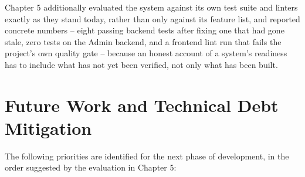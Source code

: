 \documentclass[12pt,a4paper]{report}
\begin{document}
Chapter 5 additionally evaluated the system against its own test suite
and linters exactly as they stand today, rather than only against its
feature list, and reported concrete numbers -- eight passing backend
tests after fixing one that had gone stale, zero tests on the Admin
backend, and a frontend lint run that fails the project's own quality
gate -- because an honest account of a system's readiness has to
include what has not yet been verified, not only what has been built.

\section{Future Work and Technical Debt Mitigation}

The following priorities are identified for the next phase of
development, in the order suggested by the evaluation in Chapter 5:
\end{document}
